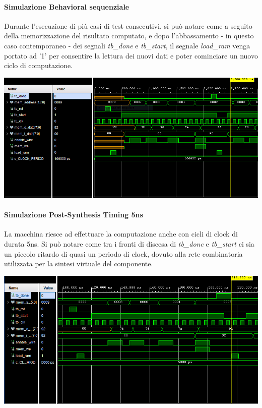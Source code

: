 \documentclass{article}
\begin{document}
\paragraph{Simulazione Behavioral sequenziale}
Durante l'esecuzione di più casi di test consecutivi, si può notare come a seguito della memorizzazione del risultato computato, e dopo l'abbassamento - in questo caso contemporaneo - dei segnali \textit{tb{\_}done} e \textit{tb{\_}start}, il segnale \textit{load{\_}ram} venga portato ad '1' per consentire la lettura dei nuovi dati e poter cominciare un nuovo ciclo di computazione.
 
\begin{flushleft}
\includegraphics[scale=0.70]{dettaglio_behavioral} \\
\end{flushleft}

\bigskip
\paragraph{Simulazione Post-Synthesis Timing 5ns}\label{fast}
La macchina riesce ad effettuare la computazione anche con cicli di clock di durata 5ns. Si può notare come tra i fronti di discesa di \textit{tb{\_}done} e \textit{tb{\_}start} ci sia un piccolo ritardo di quasi un periodo di clock, dovuto alla rete combinatoria utilizzata per la sintesi virtuale del componente.

\begin{flushleft}
\includegraphics[scale=0.75]{dettaglio_postSynthesisTiming_5ns} \\
\end{flushleft}
\end{document}
